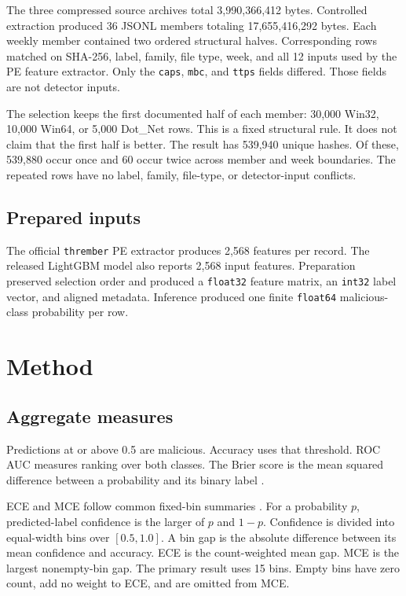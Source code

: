 \documentclass[11pt]{article}
\newcommand{\code}[1]{\texttt{#1}}
\begin{document}
The three compressed source archives total 3,990,366,412 bytes. Controlled
extraction produced 36 JSONL members totaling 17,655,416,292 bytes. Each weekly
member contained two ordered structural halves. Corresponding rows matched on
SHA-256, label, family, file type, week, and all 12 inputs used by the PE
feature extractor. Only the \code{caps}, \code{mbc}, and \code{ttps} fields
differed. Those fields are not detector inputs.

The selection keeps the first documented half of each member: 30,000 Win32,
10,000 Win64, or 5,000 Dot\_Net rows. This is a fixed structural rule. It does
not claim that the first half is better. The result has 539,940 unique hashes.
Of these, 539,880 occur once and 60 occur twice across member and week
boundaries. The repeated rows have no label, family, file-type, or
detector-input conflicts.

\subsection{Prepared inputs}

The official \code{thrember} PE extractor produces 2,568 features per record.
The released LightGBM model also reports 2,568 input features. Preparation
preserved selection order and produced a \code{float32} feature matrix, an
\code{int32} label vector, and aligned metadata. Inference produced one finite
\code{float64} malicious-class probability per row.

\section{Method}

\subsection{Aggregate measures}

Predictions at or above 0.5 are malicious. Accuracy uses that threshold. ROC
AUC measures ranking over both classes. The Brier score is the mean squared
difference between a probability and its binary label \cite{brier1950}.

ECE and MCE follow common fixed-bin summaries \cite{guo2017calibration}. For a
probability $p$, predicted-label confidence is the larger of $p$ and $1-p$.
Confidence is divided
into equal-width bins over $[0.5,1.0]$. A bin gap is the absolute difference
between its mean confidence and accuracy. ECE is the count-weighted mean gap.
MCE is the largest nonempty-bin gap. The primary result uses 15 bins. Empty bins
have zero count, add no weight to ECE, and are omitted from MCE.
\end{document}
